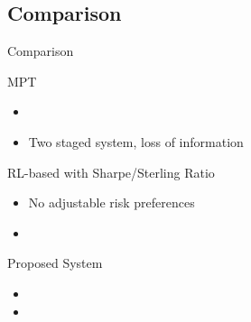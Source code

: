 \subsection{Comparison}
\begin{frame}{Comparison}
    \begin{block}{MPT}
        \begin{itemize}
            \item \color{ForestGreen}{Adjustable risk preferences}
            \item\alert{Two staged system, loss of information}
        \end{itemize}
    \end{block}
    \begin{block}{RL-based with Sharpe/Sterling Ratio}
        \begin{itemize}    
            \item \alert{No adjustable risk preferences}
            \item \color{ForestGreen}{Optimization directly}    
        \end{itemize}            
    \end{block}

    \begin{block}{Proposed System}
        \begin{itemize}
        \item \color{ForestGreen}{Adjustable risk preferences}
        \item \color{ForestGreen}{Optimization directly}  
        \end{itemize}        
    \end{block}

\end{frame}